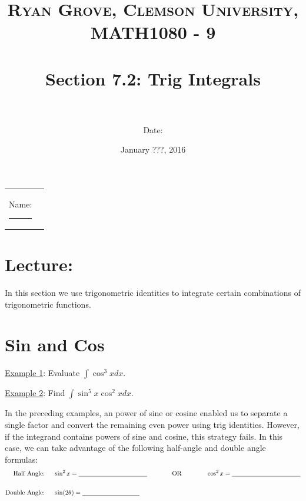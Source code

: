 \documentclass[paper=a4, fontsize=11pt]{scrartcl} %
\title{	
\normalfont \normalsize 
\textsc{Ryan Grove, Clemson University, MATH1080 - 9} \\ [25pt] %
\horrule{0.5pt} \\[0.4cm] %
\huge Section 7.2: Trig Integrals \\ %
\horrule{2pt} \\[0.5cm] %
}
\author{Date:} %
\date{\normalsize January ???, 2016} %
\numberwithin{equation}{section} %
\numberwithin{figure}{section} %
\numberwithin{table}{section} %
\newcommand{\ds}{\displaystyle}
\begin{document}
\maketitle %

\begin{flushleft}
\begin{tabular}{l l}
Name: \rule{3.2in}{.01cm}  & {}%
\end{tabular}
\end{flushleft}


\section*{\textbf{Lecture:}}

In this section we use trigonometric identities to integrate certain combinations of trigonometric functions.\\

\section*{Sin and Cos}
\indent

\underline{Example 1}: Evaluate $\ds\int \cos^3x dx$.\\
\indent

\vspace{2in}

\underline{Example 2}: Find $\ds\int \sin^5x \cos^2x dx$.\\
\indent

\vspace{4in}

In the preceding examples, an \underline{\hspace{0.5in}} power of sine or cosine enabled us to separate a single factor and convert the remaining even power using trig identities. However, if the integrand contains \underline{\hspace{0.5in}} powers of \underline{\hspace{0.5in}} sine and cosine, this strategy fails. In this case, we can take advantage of the following half-angle and double angle formulas:\\

\begin{align*}
\text{Half Angle: } \quad &\sin^2x = \underline{\hspace{1.5in}} \hspace{0.5in} \text{ OR } \hspace{0.5in} \cos^2 x =  \underline{\hspace{1.5in}}\\
\text{ } &\\
\text{Double Angle: }\quad  & \sin(2\theta) = \underline{\hspace{1.25in}}
\end{align*}
\end{document}
